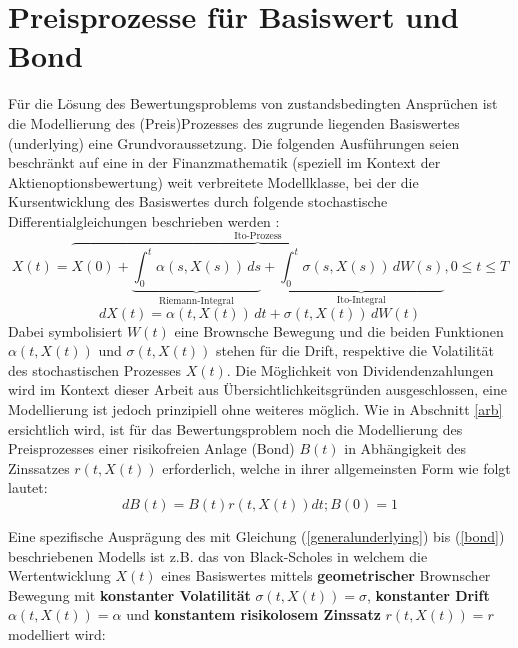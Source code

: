 \documentclass[12pt,a4paper,headsepline,bibliography=totoc,listof=totoc,headinclude=false,footinclude=false,BCOR5mm]{scrreprt} %
\begin{document}
\section{Preisprozesse f\"ur Basiswert und Bond}\label{preisp}
F\"ur die L\"osung des Bewertungsproblems von zustandsbedingten Anspr\"uchen ist die Modellierung des (Preis)Prozesses des zugrunde liegenden Basiswertes (underlying) eine Grundvoraussetzung.
Die folgenden Ausf\"uhrungen seien beschr\"ankt auf eine in der Finanzmathematik (speziell im Kontext der Aktienoptionsbewertung) weit verbreitete Modellklasse, bei der die Kursentwicklung des Basiswertes durch folgende stochastische Differentialgleichungen beschrieben werden \cite[S. 141]{Lin2006}:
 \begin{equation} \label{generalunderlying}
X(t) = \overbrace{X(0) + \underbrace{\int_0^t \! \alpha(s,X(s)) \, ds}_{\text{Riemann-Integral}} + \underbrace{\int_0^t \! \sigma(s,X(s)) \, dW(s)}_{\text{Ito-Integral}}}^{\text{Ito-Prozess}}, 0 \leq t \leq T \end{equation}
  \begin{equation} \label{diffgeneralunderlying}
dX(t)=  \alpha(t,X(t)) \, dt +  \sigma(t,X(t)) \, dW(t) \end{equation}
Dabei symbolisiert $W(t)$ eine Brownsche Bewegung und die beiden Funktionen $\alpha(t,X(t))$ und $\sigma(t,X(t))$ stehen f\"ur die Drift, respektive die Volatilit\"at des stochastischen Prozesses $X(t)$. Die M\"oglichkeit von Dividendenzahlungen wird im Kontext dieser Arbeit aus \"Ubersichtlichkeitsgr\"unden ausgeschlossen, eine Modellierung ist jedoch prinzipiell ohne weiteres m\"oglich. Wie in Abschnitt \ref{arb} ersichtlich wird, ist f\"ur das Bewertungsproblem noch die Modellierung des Preisprozesses einer risikofreien Anlage (Bond) $B(t)$ in Abh\"angigkeit des Zinssatzes $r(t,X(t))$ erforderlich, welche in ihrer allgemeinsten Form wie folgt lautet: 
  \begin{equation} \label{bond}
dB(t) = B(t)r(t,X(t))dt; B(0)=1 \end{equation}

Eine spezifische Auspr\"agung des mit Gleichung (\ref{generalunderlying}) bis (\ref{bond}) beschriebenen Modells ist z.B. das von Black-Scholes \cite{Black73} in welchem die Wertentwicklung $X(t)$ eines Basiswertes mittels {\bf geometrischer} Brownscher Bewegung mit {\bf konstanter Volatilit\"at} \begin{math}\sigma(t,X(t))=\sigma\end{math},  {\bf konstanter Drift} \begin{math}\alpha(t,X(t))=\alpha\end{math} und {\bf konstantem risikolosem Zinssatz} \begin{math}r(t,X(t))=r\end{math} modelliert wird:
\newpage
\end{document}
